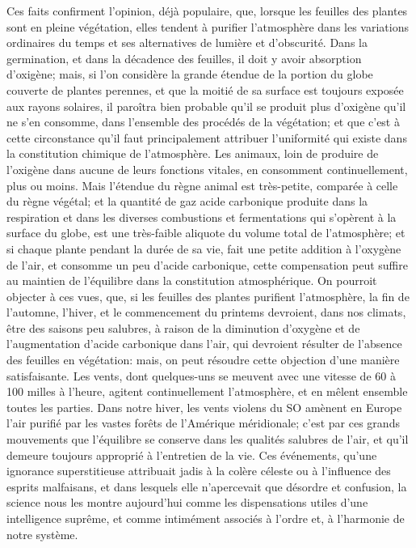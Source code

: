 Ces faits confirment l'opinion, déjà populaire, que, lorsque les feuilles des plantes sont en pleine végétation, elles tendent à purifier l'atmosphère dans les variations ordinaires du temps et ses alternatives de lumière et d'obscurité.
Dans la germination, et dans la décadence des feuilles, il doit y avoir absorption d'oxigène; mais, si l'on considère la grande étendue de la portion du globe couverte de plantes perennes, et que la moitié de sa surface est toujours exposée aux rayons solaires, il paroîtra bien probable qu'il se produit plus d'oxigène qu'il ne s'en consomme, dans l'ensemble des procédés de la végétation; et que c'est à cette circonstance qu'il faut principalement attribuer l'uniformité qui existe dans la constitution chimique de l'atmosphère.
Les animaux, loin de produire de l'oxigène dans aucune de leurs fonctions vitales, en consomment continuellement, plus\setcounter{page}{32} ou moins. Mais l'étendue du règne animal est très-petite, comparée à celle du règne végétal; et la quantité de gaz acide carbonique produite dans la respiration et dans les diverses combustions et fermentations qui s'opèrent à la surface du globe, est une très-faible aliquote du volume total de l'atmosphère; et si chaque plante pendant la durée de sa vie, fait une petite addition à l'oxygène de l'air, et consomme un peu d'acide carbonique, cette compensation peut suffire au maintien de l'équilibre dans la constitution atmosphérique.
On pourroit objecter à ces vues, que, si les feuilles des plantes purifient l'atmosphère, la fin de l'automne, l'hiver, et le commencement du printems devroient, dans nos climats, être des saisons peu salubres, à raison de la diminution d'oxygène et de l'augmentation d'acide carbonique dans l'air, qui devroient résulter de l'absence des feuilles en végétation: mais, on peut résoudre cette objection d'une manière satisfaisante. Les vents, dont quelques-uns se meuvent avec une vitesse de 60 à 100 milles à l'heure, agitent continuellement l'atmosphère, et en mêlent ensemble toutes les parties. Dans notre hiver, les vents violens du SO amènent en Europe l'air purifié par les vastes forêts de l'Amérique\setcounter{page}{33} méridionale; c'est par ces grands mouvements que l'équilibre se conserve dans les qualités salubres de l'air, et qu'il demeure toujours approprié à l'entretien de la vie. Ces événements, qu'une ignorance superstitieuse attribuait jadis à la colère céleste ou à l'influence des esprits malfaisans, et dans lesquels elle n'apercevait que désordre et confusion, la science nous les montre aujourd'hui comme les dispensations utiles d'une intelligence suprême, et comme intimément associés à l'ordre et, à l'harmonie de notre système.
